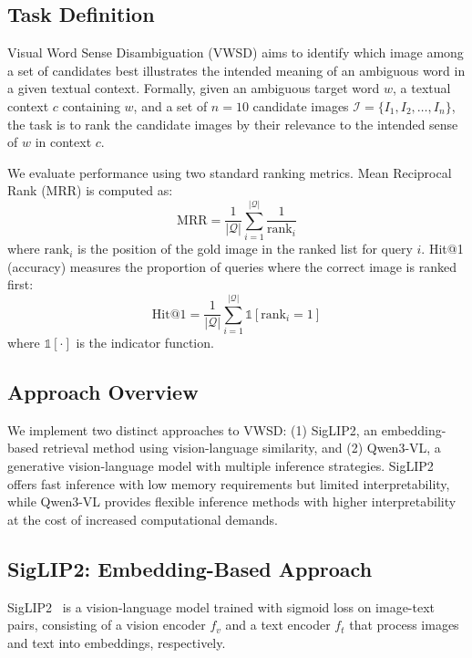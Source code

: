 \documentclass[11pt]{article}
\begin{document}
\subsection{Task Definition}
\label{subsec:task_definition}

Visual Word Sense Disambiguation (VWSD) aims to identify which image among a set of candidates best illustrates the intended meaning of an ambiguous word in a given textual context. Formally, given an ambiguous target word $w$, a textual context $c$ containing $w$, and a set of $n=10$ candidate images $\mathcal{I} = \{I_1, I_2, \ldots, I_n\}$, the task is to rank the candidate images by their relevance to the intended sense of $w$ in context $c$.

We evaluate performance using two standard ranking metrics. Mean Reciprocal Rank (MRR) is computed as:
\begin{equation}
\text{MRR} = \frac{1}{|\mathcal{Q}|} \sum_{i=1}^{|\mathcal{Q}|} \frac{1}{\text{rank}_i}
\end{equation}
where $\text{rank}_i$ is the position of the gold image in the ranked list for query $i$. Hit@1 (accuracy) measures the proportion of queries where the correct image is ranked first:
\begin{equation}
\text{Hit@1} = \frac{1}{|\mathcal{Q}|} \sum_{i=1}^{|\mathcal{Q}|} \mathbb{1}[\text{rank}_i = 1]
\end{equation}
where $\mathbb{1}[\cdot]$ is the indicator function.

\subsection{Approach Overview}
\label{subsec:approach_overview}

We implement two distinct approaches to VWSD: (1) SigLIP2, an embedding-based retrieval method using vision-language similarity, and (2) Qwen3-VL, a generative vision-language model with multiple inference strategies. SigLIP2 offers fast inference with low memory requirements but limited interpretability, while Qwen3-VL provides flexible inference methods with higher interpretability at the cost of increased computational demands.

\subsection{SigLIP2: Embedding-Based Approach}
\label{subsec:siglip2}

SigLIP2~\cite{zhai2023siglip} is a vision-language model trained with sigmoid loss on image-text pairs, consisting of a vision encoder $f_v$ and a text encoder $f_t$ that process images and text into embeddings, respectively.
\end{document}
